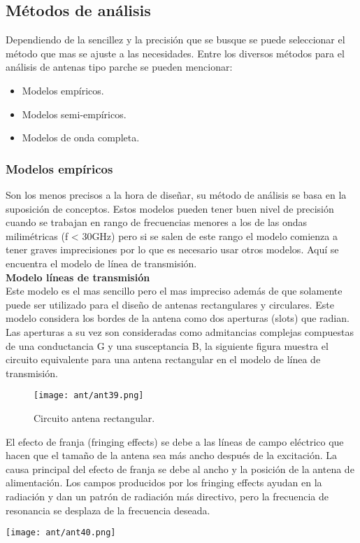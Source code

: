 \documentclass[
	12pt, %
	fleqn, %
	a4paper, %
	oneside, %
]{LegrandOrangeBook}
\begin{document}
\subsection{Métodos de análisis}
Dependiendo de la sencillez y la precisión que se busque se puede seleccionar el método que mas se ajuste a las necesidades. Entre los diversos métodos para el análisis de antenas tipo parche se pueden mencionar:
\begin{itemize}
\item Modelos empíricos.
\item Modelos semi-empíricos.
\item Modelos de onda completa.
\end{itemize}
\subsubsection{Modelos empíricos}
Son los menos precisos a la hora de diseñar, su método de análisis se basa en la suposición de conceptos. Estos modelos pueden tener buen nivel de precisión cuando se trabajan en rango de frecuencias menores a los de las ondas milimétricas (f < 30GHz) pero si se salen de este rango el modelo comienza a tener graves imprecisiones por lo que es necesario usar otros modelos. Aquí se encuentra el modelo de línea de transmisión.\\
\textbf{Modelo líneas de transmisión}\\
Este modelo es el mas sencillo pero el mas impreciso además de que solamente puede ser utilizado para el diseño de antenas rectangulares y circulares. Este modelo considera los bordes de la antena como dos aperturas (slots) que radian.
Las aperturas a su vez son consideradas como admitancias complejas compuestas de una conductancia G y una susceptancia B, la siguiente figura muestra el circuito equivalente para una antena rectangular en el modelo de línea de transmisión.
\begin{figure}[H]
\centering
\texttt{[image: ant/ant39.png]}
\caption{Circuito antena rectangular.}
\end{figure}
\begin{definition}
El efecto de franja (fringing effects) se debe a las líneas de campo eléctrico que hacen que el tamaño de la antena sea más ancho después de la excitación. La causa principal del efecto de franja se debe al ancho y la posición de la antena de alimentación. Los campos producidos por los fringing effects ayudan en la radiación y dan un patrón de radiación más directivo, pero la frecuencia de resonancia se desplaza de la frecuencia deseada.
\begin{center}
\texttt{[image: ant/ant40.png]}
\end{center}
\end{definition}
\end{document}
